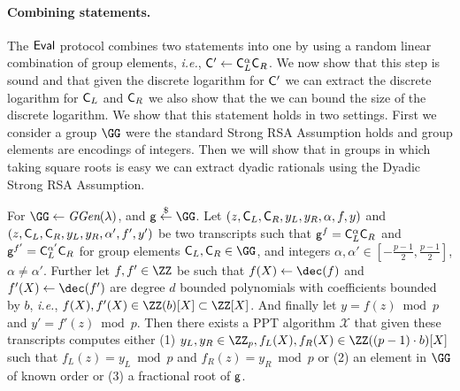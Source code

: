 \paragraph{Combining statements.} The $\textsf{{Eval}}$ protocol combines two statements into one by using a random linear combination of group elements, \emph{i.e.}, $\mathsf{C}'\gets \mathsf{C}_L^{\alpha}\mathsf{C}_R$. We now show that this step is sound and that given the discrete logarithm for $\mathsf{C}'$ we can extract the discrete logarithm for $\mathsf{C}_L$ and $\mathsf{C}_R$ we also show that the we can bound the size of the discrete logarithm. We show that this statement holds in two settings. First we consider a group $\GG$ were the standard Strong RSA Assumption holds and group elements are encodings of integers. 
Then we will show that in groups in which taking square roots is easy we can extract dyadic rationals using the Dyadic Strong RSA Assumption.
\begin{lemma}
\label{lem:intrandomcombine}
	For $\GG \gets \ggen(\lambda)$, and $\gr{g}\sample \GG$. 
	Let $(z,\mathsf{C}_L,\mathsf{C}_R,y_L,y_R,\alpha,f,y)$ and  $(z,\mathsf{C}_L,\mathsf{C}_R,y_L,y_R,\alpha',f',y')$ be two transcripts such that $\mathsf{g}^{f}=\mathsf{C}_L^{\alpha}\mathsf{C}_R$ and $\mathsf{g}^{f'}=\mathsf{C}_L^{\alpha'}\mathsf{C}_R$ for group elements $\gr{C}_L,\gr{C}_R \in \GG$, and integers $\alpha,\alpha' \in  [-\frac{p-1}{2},\frac{p-1}{2}]$, $\alpha\neq \alpha'$. Further let $f,f'\in \ZZ$ be such that $f(X)\gets\dec(f)$ and $f'(X)\gets\dec(f')$ are degree $d$ bounded polynomials with coefficients bounded by $b$, \emph{i.e.}, $f(X),f'(X)\in \ZZ(b)[X]\subset \ZZ[X]$. And finally let $y=f(z)\bmod p$ and $y'=f'(z)\bmod p$.
	 Then there exists a PPT algorithm $\mathcal{X}$ that given these transcripts computes either (1) $y_L,y_R\in \ZZ_p,f_L(X),f_R(X)\in \ZZ((p-1) \cdot b)[X]$  such that $f_L(z)=y_L\bmod p$ and $f_R(z)=y_R \bmod p$ or (2) an element in $\GG$ of known order or (3) a fractional root of $\mathsf{g}$.
\end{lemma}

